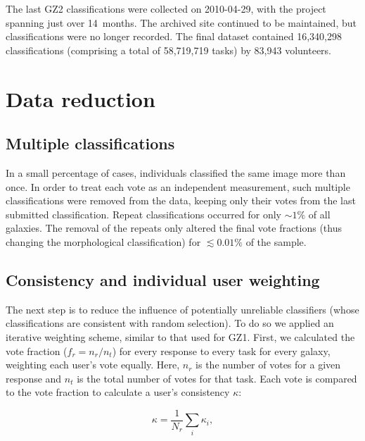 \documentclass[useAMS,usenatbib]{mn2e}
\begin{document}
The last GZ2 classifications were collected on 2010-04-29, with the project spanning just over 14~months. The archived site continued to be maintained, but classifications were no longer recorded. The final dataset contained 16,340,298 classifications (comprising a total of 58,719,719 tasks) by 83,943 volunteers.


\section{Data reduction} \label{sec-datareduction}

\subsection{Multiple classifications}
In a small percentage of cases, individuals classified the same image more than once. In order to treat each vote as an independent measurement, such multiple classifications were removed from the data, keeping only their votes from the last submitted classification. Repeat classifications occurred for only $\sim1\%$ of all galaxies. The removal of the repeats only altered the final vote fractions (thus changing the morphological classification) for $\lesssim0.01\%$ of the sample.  

\subsection{Consistency and individual user weighting}\label{ssec-consistency}

The next step is to reduce the influence of potentially unreliable classifiers (whose classifications are consistent with random selection). To do so we applied an iterative weighting scheme, similar to that used for GZ1. First, we calculated the vote fraction ($f_r = n_{r}/n_{t}$) for every response to every task for every galaxy, weighting each user's vote equally. Here, $n_r$ is the number of votes for a given response and $n_{t}$ is the total number of votes for that task. Each vote is compared to the vote fraction to calculate a user's consistency $\kappa$:

\begin{equation}
\kappa = \frac{1}{N_r}\sum_i{\kappa_i},
\label{eqn-consistency}
\end{equation}
\end{document}
